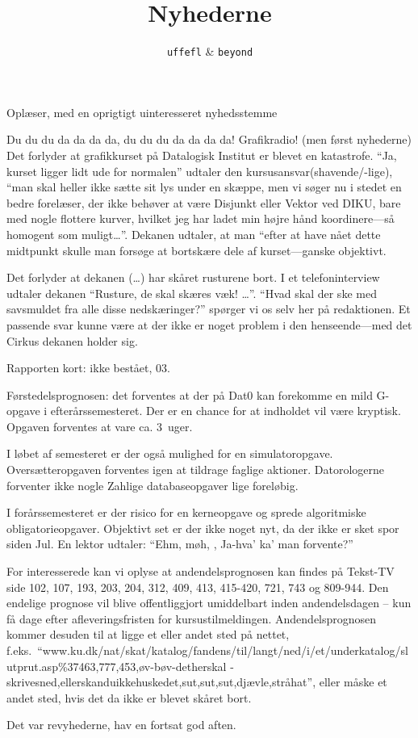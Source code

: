 \documentclass[danish,11pt]{article}
\title{Nyhederne}
\author{{\tt uffefl} \& {\tt beyond}}
\begin{document}
\maketitle

\begin{roles}
   Oplæser, med en oprigtigt uinteresseret nyhedsstemme
\end{roles}

\begin{sketch}
   Du du du da da da da, du du du da da da da! Grafikradio! (men
  først nyhederne) Det forlyder at grafikkurset på Datalogisk Institut er
  blevet en katastrofe. ``Ja, kurset ligger lidt ude for normalen'' udtaler
  den kursusansvar(shavende/-lige), ``man skal heller ikke sætte sit lys
  under en skæppe, men vi søger nu i stedet en bedre forelæser, der ikke
  behøver at være Disjunkt eller Vektor ved DIKU, bare med nogle flottere
  kurver, hvilket jeg har ladet min højre hånd koordinere---så homogent som
  muligt\dots''.  Dekanen udtaler, at man ``efter at have nået dette
  midtpunkt skulle man forsøge at bortskære dele af kurset---ganske objektivt.
  
  Det forlyder at dekanen (\ldots) har skåret rusturene bort. I et
  telefoninterview udtaler dekanen ``Rusture, de skal skæres væk! \ldots''.
  ``Hvad skal der ske med savsmuldet fra alle disse nedskæringer?'' spørger
  vi os selv her på redaktionen. Et passende svar kunne være at der ikke er
  noget problem i den henseende---med det Cirkus dekanen holder sig.

Rapporten kort: ikke bestået, 03.

Førstedelsprognosen: det forventes at der på Dat0 kan forekomme en mild G-opgave
i efterårssemesteret. Der er en chance for at indholdet vil være kryptisk.
Opgaven forventes at vare ca. 3~uger. 

I løbet af semesteret er der også mulighed for en simulatoropgave.
Oversætteropgaven forventes igen at tildrage faglige aktioner. Datorologerne
forventer ikke nogle Zahlige databaseopgaver lige foreløbig.

I forårssemesteret er der risico for en kerneopgave og sprede algoritmiske
obligatorieopgaver. Objektivt set er der ikke noget nyt, da der ikke er
sket spor siden Jul. En lektor udtaler: ``Ehm, møh, ,
Ja-hva' ka' man forvente?''

For interesserede kan vi oplyse at andendelsprognosen kan findes på Tekst-TV
side 102, 107, 193, 203, 204, 312, 409, 413, 415-420, 721, 743 og 809-944. Den
endelige prognose vil blive offentliggjort umiddelbart inden andendelsdagen --
kun få dage efter afleveringsfristen for
kursustilmeldingen. Andendelsprognosen kommer desuden til at ligge et eller
andet sted på nettet, f.eks.\
``www.ku.dk/nat/skat/katalog/fandens/\-til/\-langt/\-ned/i/et/underkatalog/slutprut.asp\%37463,777,453,\-øv-bøv-detherskal
-skrives\-ned,ellerskanduikkehuskedet\-,sut,sut,sut,djævle\act{pause)},stråhat'',
eller måske et andet sted, hvis det da ikke er blevet skåret bort.

Det var revyhederne, hav en fortsat god aften.

\end{sketch}
\end{document}
